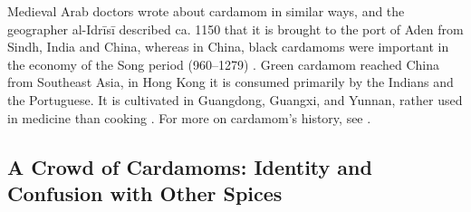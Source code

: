 Medieval Arab doctors wrote about cardamom in similar ways, and the geographer al-Idrīsī described  ca. 1150 that it is brought to the port of Aden from Sindh, India and China, whereas in China, black cardamoms were important in the economy of the Song period (960–1279) \autocite[158-159]{prance_cultural_2005}. Green cardamom reached China from Southeast Asia, in Hong Kong it is consumed primarily by the Indians and the Portuguese. It is cultivated in Guangdong, Guangxi, and Yunnan, rather used in medicine than cooking \autocite[325-326]{hu_food_2005}. For more on cardamom's history, see \textcite[102-106]{dalby_dangerous_2000}.


\subsection{A Crowd of Cardamoms: Identity and Confusion with Other Spices}
\label{sec:crowd_of_cardamoms}

% 


